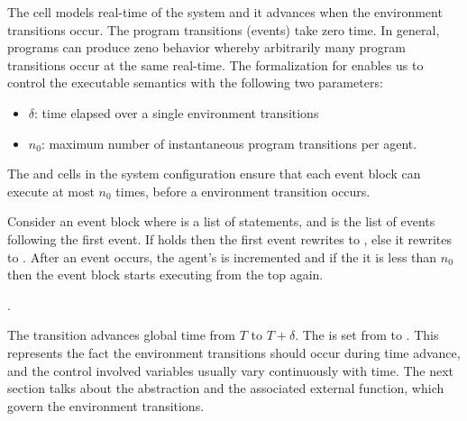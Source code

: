 The  cell models real-time  of the system and it advances when the environment transitions occur. The program transitions (events) take zero time. In general, \rolang programs can produce zeno behavior whereby arbitrarily many program transitions occur at the same real-time. The \K formalization for \rolang enables us to control the executable semantics with the following two parameters:
 \begin{itemize}
 \item $\delta$: time elapsed over a single environment transitions 
 \item $n_0$: maximum number of instantaneous program transitions per agent.
 \end{itemize}
  The  and  cells in the system configuration ensure that each event block can execute at most ${n_0}$ times, before a environment transition occurs. 
 
Consider an event block  where  is a list of statements, and  is the list of events following the first event. If  holds then the first event rewrites to , else it  rewrites to .  
After an event occurs, the agent's  is incremented and if the it is less than $n_0$ then the event block starts executing from the top again.

.

	The  transition advances global time from  $T$ to $T+\delta$. The  is set from  to . This represents the fact the environment transitions should occur during time advance, and the control involved variables usually vary continuously with time. The next section talks about the  abstraction and the associated external function, which govern the environment transitions. 
	 

%	


